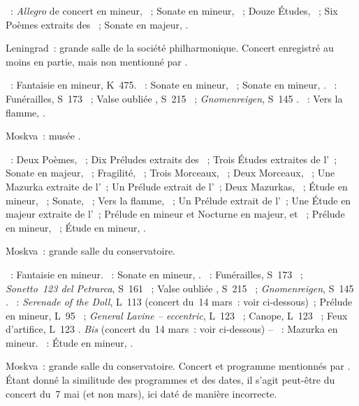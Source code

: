 \begin{description}
 \textsc{\Scriabine{}}~: \emph{Allegro} de concert en \kB \Flat mineur,
 ~; Sonate en \kF \Sharp mineur, ~; Douze Études,
 ~; Six Poèmes extraits des ~;
 Sonate en \kF \Sharp majeur, .
 \item[\DateWithWeekDay{1952-02-03}]
 Leningrad~: grande salle de la société philharmonique.
 Concert enregistré au moins en partie, mais non mentionné par
 \citet[p.~434]{Scriabine}.

 \textsc{\Mozart{}}~: Fantaisie en \kC mineur, K~475.
 \textsc{\Beethoven{}}~: Sonate en \kC \Sharp mineur,  ~;
 Sonate en \kC mineur, .
 \textsc{\Liszt{}}~: Funérailles, S~173 ~; Valse oubliée
 , S~215 ~; \emph{Gnomenreigen}, S~145 .
 \textsc{\Scriabine{}}~: Vers la flamme, .
 \item[\DateWithWeekDay{1952-02-24}]
 Moskva~: musée \Scriabine{}.

 \textsc{\Scriabine{}}~: Deux Poèmes, ~; Dix Préludes extraits des
 ~; Trois Études extraites de l'~; Sonate en
 \kF \Sharp majeur, ~; Fragilité,  ~; Trois
 Morceaux, ~; Deux Morceaux, ~; Une Mazurka extraite de
 l'~; Un Prélude extrait de l'~; Deux Mazurkas,
 ~; Étude en \kC \Sharp mineur,  ~; Sonate,
 ~; Vers la flamme, ~; Un Prélude extrait de l'~;
 Une Étude en \kF \Sharp majeur extraite de l'~; Prélude en \kC
 \Sharp mineur et Nocturne en \kD \Flat majeur,   et
 ~; Prélude en \kE \Flat mineur,  ~; Étude en
 \kD \Sharp mineur,  .
 \item[\DateWithWeekDay{1952-03-02}]
 Moskva~: grande salle du conservatoire.

 \textsc{\Mozart{}}~: Fantaisie en \kC mineur.
 \textsc{\Beethoven{}}~: Sonate en \kC \Sharp mineur,  .
 \textsc{\Liszt{}}~: Funérailles, S~173 ~; \emph{Sonetto~123 del
 Petrarca}, S~161 ~; Valse oubliée , S~215 ~;
 \emph{Gnomenreigen}, S~145 .
 \textsc{\Debussy{}}~: \emph{Serenade of the Doll}, L~113 
 (concert du~14 mars~: voir ci-dessous)~; Prélude en \kA mineur, L~95
 ~; \emph{General Lavine -- eccentric}, L~123 ~;
 Canope, L~123 ~; Feux d'artifice, L~123 .
 \emph{Bis} (concert du~14 mars~: voir ci-dessous) -- \textsc{\Chopin{}}~:
 Mazurka en \kF mineur.
 \textsc{\Scriabine{}}~: Étude en \kB \Flat mineur, .
 \item[\DateWithWeekDay{1952-03-07}]
 Moskva~: grande salle du conservatoire.
 Concert et programme mentionnés par \citet[p.~173]{Nekrasova08}.
 Étant donné la similitude des programmes et des dates, il s'agit peut-être
 du concert du~7 mai (et non mars), ici daté de manière incorrecte.


\end{description}
